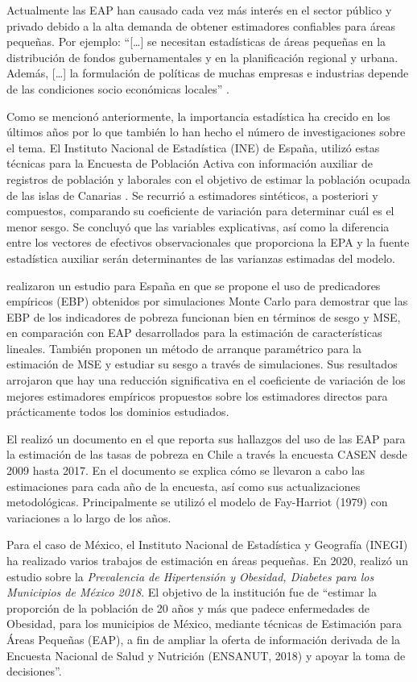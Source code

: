 \documentclass[
  11pt,
  oneside]{book}
\begin{document}
Actualmente las EAP han causado cada vez más interés en el sector público y privado debido a la alta demanda de obtener estimadores confiables para áreas pequeñas. Por ejemplo: ``{[}\ldots{]} se necesitan estadísticas de áreas pequeñas en la distribución de fondos gubernamentales y en la planificación regional y urbana. Además, {[}\ldots{]} la formulación de políticas de muchas empresas e industrias depende de las condiciones socio económicas locales'' \citep[p.~56]{Gosh&Rao1994}.

Como se mencionó anteriormente, la importancia estadística ha crecido en los últimos años por lo que también lo han hecho el número de investigaciones sobre el tema. El Instituto Nacional de Estadística (INE) de España, utilizó estas técnicas para la Encuesta de Población Activa con información auxiliar de registros de población y laborales con el objetivo de estimar la población ocupada de las islas de Canarias \citep{Paños2000}. Se recurrió a estimadores sintéticos, a posteriori y compuestos, comparando su coeficiente de variación para determinar cuál es el menor sesgo. Se concluyó que las variables explicativas, así como la diferencia entre los vectores de efectivos observacionales que proporciona la EPA y la fuente estadística auxiliar serán determinantes de las varianzas estimadas del modelo.

\citep{Molina2010} realizaron un estudio para España en que se propone el uso de predicadores empíricos (EBP) obtenidos por simulaciones Monte Carlo para demostrar que las EBP de los indicadores de pobreza funcionan bien en términos de sesgo y MSE, en comparación con EAP desarrollados para la estimación de características lineales. También proponen un método de arranque paramétrico para la estimación de MSE y estudiar su sesgo a través de simulaciones. Sus resultados arrojaron que hay una reducción significativa en el coeficiente de variación de los mejores estimadores empíricos propuestos sobre los estimadores directos para prácticamente todos los dominios estudiados.

El \citep{Ministerio2017} realizó un documento en el que reporta sus hallazgos del uso de las EAP para la estimación de las tasas de pobreza en Chile a través la encuesta CASEN desde 2009 hasta 2017. En el documento se explica cómo se llevaron a cabo las estimaciones para cada año de la encuesta, así como sus actualizaciones metodológicas. Principalmente se utilizó el modelo de Fay-Harriot (1979) con variaciones a lo largo de los años.

Para el caso de México, el Instituto Nacional de Estadística y Geografía (INEGI) ha realizado varios trabajos de estimación en áreas pequeñas. En 2020, realizó un estudio sobre la \emph{Prevalencia de Hipertensión y Obesidad, Diabetes para los Municipios de México 2018}. El objetivo de la institución fue de ``estimar la proporción de la población de 20 años y más que padece enfermedades de Obesidad, para los municipios de México, mediante técnicas de Estimación para Áreas Pequeñas (EAP), a fin de ampliar la oferta de información derivada de la Encuesta Nacional de Salud y Nutrición (ENSANUT, 2018) y apoyar la toma de decisiones''\citep{INEGI2020EAP}.
\end{document}

